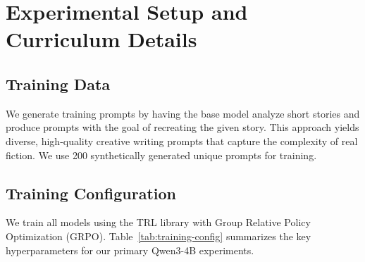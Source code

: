 \documentclass{article}
\theoremstyle{plain}
\theoremstyle{definition}
\theoremstyle{remark}
\begin{document}
\section{Experimental Setup and Curriculum Details}
\label{app:experimental-setup}

\subsection{Training Data}

We generate training prompts by having the base model analyze short stories and produce prompts with the goal of recreating the given story. This approach yields diverse, high-quality creative writing prompts that capture the complexity of real fiction. We use 200 synthetically generated unique prompts for training.

\subsection{Training Configuration}
\label{app:trainingconfig}
We train all models using the TRL library \citep{vonwerra2020trl} with Group Relative Policy Optimization (GRPO). Table~\ref{tab:training-config} summarizes the key hyperparameters for our primary Qwen3-4B experiments.
\end{document}
